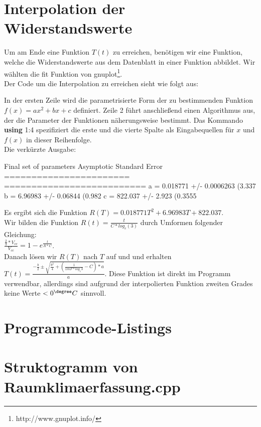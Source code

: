 \documentclass[12pt,titlepage]{article}
\begin{document}
	\section{Interpolation der Widerstandswerte}
		Um am Ende eine Funktion $T(t)$ zu erreichen, benötigen wir eine Funktion, welche die Widerstandswerte aus dem Datenblatt in einer Funktion abbildet. Wir wählten die fit Funktion von gnuplot\footnote{http://www.gnuplot.info/}.\\
		Der Code um die Interpolation zu erreichen sieht wie folgt aus:
		
		In der ersten Zeile wird die parametrisierte Form der zu bestimmenden Funktion\\
		$f(x)=ax^2+bx+c$ definiert.
		Zeile 2 führt anschließend einen Algorithmus aus, der die Parameter der Funktionen näherungsweise bestimmt.
		Das Kommando \textbf{using} 1:4 spezifiziert die erste und die vierte Spalte als Eingabequellen für $x$ und $f(x)$ in dieser Reihenfolge.\\
		Die verkürzte Ausgabe:
		\begin{listing}

Final set of parameters       Asymptotic Standard Error
=======================       ==========================
a          = 0.018771         +/- 0.0006263    (3.337%
b          = 6.96983          +/- 0.06844      (0.982%
c          = 822.037          +/- 2.923        (0.3555%
		\end{listing}
		Es ergibt sich die Funktion $R(T)=0.018771T^2+6.96983T+ 822.037$.
		\hfill \\
		Wir bilden die Funktion $R(t)=\frac{t}{C*log_e(3)}$ durch Umformen folgender Gleichung:\\
		$\frac{\frac{2}{3}*V_{cc}}{V_{cc}} = 1-e^{\frac{t}{R*C}}$.\\
		Danach lösen wir $R(T)$ nach $T$ auf und und erhalten $T(t)=\frac{-\frac{b}{2}\pm\sqrt{\frac{b^2}{4}+(\frac{1}{1mF*log_e{3}}-C)*a}}{a}$.
		Diese Funktion ist direkt im Programm verwendbar, allerdings sind aufgrund der interpolierten Funktion zweiten Grades keine Werte $<0^{\degree}C$ sinnvoll.
		
\section{Programmcode-Listings}
	
	
	

\section{Struktogramm von Raumklimaerfassung.cpp}
	
\end{document}
